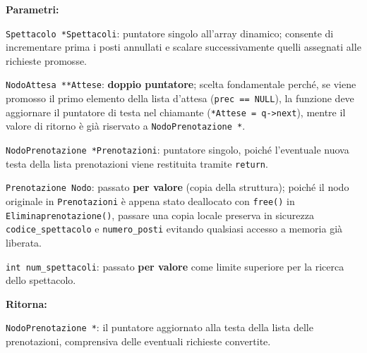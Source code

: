 \documentclass[11pt,a4paper,oneside,openany]{book}
\newenvironment{listacomp}{%
    \small
    \begin{list}{\textendash}{%
        \setlength{\topsep}{2pt}%
        \setlength{\partopsep}{0pt}%
        \setlength{\itemsep}{1pt}%
        \setlength{\parsep}{0pt}%
        \setlength{\leftmargin}{1.2em}%
    }%
}{%
    \end{list}%
}
\begin{document}
\noindent\textbf{Parametri:}
\begin{listacomp}
    \item \texttt{Spettacolo *Spettacoli}: puntatore singolo all'array dinamico; consente di incrementare prima i posti annullati e scalare successivamente quelli assegnati alle richieste promosse.
    \item \texttt{NodoAttesa **Attese}: \textbf{doppio puntatore}; scelta fondamentale perché, se viene promosso il primo elemento della lista d'attesa (\texttt{prec == NULL}), la funzione deve aggiornare il puntatore di testa nel chiamante (\texttt{*Attese = q->next}), mentre il valore di ritorno è già riservato a \texttt{NodoPrenotazione *}.
    \item \texttt{NodoPrenotazione *Prenotazioni}: puntatore singolo, poiché l'eventuale nuova testa della lista prenotazioni viene restituita tramite \texttt{return}.
    \item \texttt{Prenotazione Nodo}: passato \textbf{per valore} (copia della struttura); poiché il nodo originale in \texttt{Prenotazioni} è appena stato deallocato con \texttt{free()} in \texttt{Eliminaprenotazione()}, passare una copia locale preserva in sicurezza \texttt{codice\_spettacolo} e \texttt{numero\_posti} evitando qualsiasi accesso a memoria già liberata.
    \item \texttt{int num\_spettacoli}: passato \textbf{per valore} come limite superiore per la ricerca dello spettacolo.
\end{listacomp}

\noindent\textbf{Ritorna:}
\begin{listacomp}
    \item \texttt{NodoPrenotazione *}: il puntatore aggiornato alla testa della lista delle prenotazioni, comprensiva delle eventuali richieste convertite.
\end{listacomp}
\end{document}
